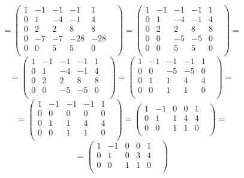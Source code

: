 \documentclass[a4paper,12pt]{article}
\begin{document}
\[
=
\begin{pmatrix}
1 & -1 & -1 & -1 & 1 & \\
0 & 1 & -4 & -1 & 4 & \\
0 & 2 & 2 & 8 & 8 & \\
0 & -7 & -7 & -28 & -28 & \\
0 & 0 & 5 & 5 & 0 & \\
\end{pmatrix}
=
\begin{pmatrix}
1 & -1 & -1 & -1 & 1 & \\
0 & 1 & -4 & -1 & 4 & \\
0 & 2 & 2 & 8 & 8 & \\
0 & 0 & -5 & -5 & 0 & \\
0 & 0 & 5 & 5 & 0 & \\
\end{pmatrix}
=
\]
\[
=
\begin{pmatrix}
1 & -1 & -1 & -1 & 1 & \\
0 & 1 & -4 & -1 & 4 & \\
0 & 2 & 2 & 8 & 8 & \\
0 & 0 & -5 & -5 & 0 & \\
\end{pmatrix}
=
\begin{pmatrix}
1 & -1 & -1 & -1 & 1 & \\
0 & 0 & -5 & -5 & 0 & \\
0 & 1 & 1 & 4 & 4 & \\
0 & 0 & 1 & 1 & 0 & \\
\end{pmatrix}
=
\]
\[
=
\begin{pmatrix}
1 & -1 & -1 & -1 & 1 & \\
0 & 0 & 0 & 0 & 0 & \\
0 & 1 & 1 & 4 & 4 & \\
0 & 0 & 1 & 1 & 0 & \\
\end{pmatrix}
=
\begin{pmatrix}
1 & -1 & 0 & 0 & 1 & \\
0 & 1 & 1 & 4 & 4 & \\
0 & 0 & 1 & 1 & 0 & \\
\end{pmatrix}
=
\]
\[
=
\begin{pmatrix}
1 & -1 & 0 & 0 & 1 & \\
0 & 1 & 0 & 3 & 4 & \\
0 & 0 & 1 & 1 & 0 & \\
\end{pmatrix}
\]
\end{document}
